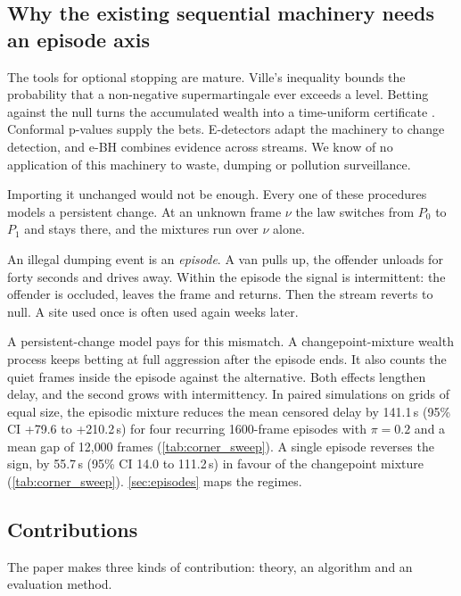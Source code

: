 \subsection{Why the existing sequential machinery needs an episode axis}

The tools for optional stopping are mature. Ville's inequality \citep{ville1939}
bounds the probability that a non-negative supermartingale ever exceeds a level.
Betting against the null turns the accumulated wealth into a time-uniform
certificate \citep{shafer2019game,ramdas2023savi}. Conformal p-values
\citep{vovk2005alrw} supply the bets. E-detectors \citep{shin2024edetectors} adapt
the machinery to change detection, and e-BH \citep{wang2022ebh} combines evidence
across streams. We know of no application of this machinery to waste, dumping or
pollution surveillance.

Importing it unchanged would not be enough. Every one of these procedures models a
persistent change. At an unknown frame $\nu$ the law switches from $P_0$ to $P_1$
and stays there, and the mixtures run over $\nu$ alone.

An illegal dumping event is an \emph{episode}. A van pulls up, the offender unloads
for forty seconds and drives away. Within the episode the signal is intermittent:
the offender is occluded, leaves the frame and returns. Then the stream reverts to
null. A site used once is often used again weeks later.

A persistent-change model pays for this mismatch. A changepoint-mixture wealth
process keeps betting at full aggression after the episode ends. It also counts the
quiet frames inside the episode against the alternative. Both effects lengthen
delay, and the second grows with intermittency. In paired simulations on grids of equal
size, the episodic mixture reduces the mean censored delay by 141.1\,s (95\% CI +79.6
to +210.2\,s) for four recurring 1600-frame episodes with $\pi=0.2$ and a mean gap of
12{,}000 frames (\cref{tab:corner_sweep}). A single episode reverses the sign, by 55.7\,s (95\% CI 14.0 to
111.2\,s) in favour of the changepoint mixture (\cref{tab:corner_sweep}). \cref{sec:episodes} maps the regimes.

\subsection{Contributions}

The paper makes three kinds of contribution: theory, an algorithm and an
evaluation method.

